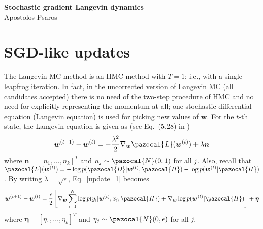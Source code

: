 

\newcommand{\bw}{\boldsymbol{w}}
\newcommand{\bp}{\boldsymbol{p}}
\newcommand{\bth}{\boldsymbol{\theta}}
\newcommand{\bA}{\boldsymbol{A}}
\newcommand{\cH}{\pazocal{H}}
\newcommand{\cN}{\pazocal{N}}
\newcommand{\cP}{\pazocal{P}}
\newcommand{\cD}{\pazocal{D}}
\newcommand{\cO}{\pazocal{O}}
\newcommand{\cL}{\pazocal{L}}


\setcounter{tocdepth}{3}

	
	\sloppy
	
	\begin{center}	
		\Large
		\textbf{Stochastic gradient Langevin dynamics}\\
		\large
		Apostolos Psaros\\	
	\end{center}
	\vskip 0.25in
	


\section{SGD-like updates}\label{sec:introduction}
The Langevin MC method is an HMC method with $T=1$; i.e., with a single leapfrog iteration. 
In fact, in the uncorrected version of Langevin MC (all candidates accepted) there is no need of the two-step procedure of HMC and no need for explicitly representing the momentum at all; one stochastic differential equation (Langevin equation) is used for picking new values of $\bw$. 
For the $t$-th state, the Langevin equation is given as (see Eq.~(5.28) in \cite{neal1993probabilistic})
\begin{equation}\label{update_1}
	\bw^{(t+1)} - \bw^{(t)} = -\frac{\lambda^2}{2} \nabla_{\bw} \cL(\bw^{(t)}) + \lambda \boldsymbol{n}
\end{equation}
where $\boldsymbol{n} = [n_1,\dots,n_k]^T$ and $n_j \sim \cN(0, 1)$ for all $j$. 
Also, recall that $\cL(\bw^{(t)}) = -\log p(\cD|\bw^{(t)},\cH) - \log p(\bw^{(t)}|\cH)$. 
By writing $\lambda = \sqrt{\epsilon}$, Eq.~\eqref{update_1} becomes
\begin{equation}\label{update_2}
\bw^{(t+1)} - \bw^{(t)}= \frac{\epsilon}{2} \left[\nabla_{\bw} \sum_{i=1}^{N}\log p(y_i|\bw^{(t)},x_i,\cH) + \nabla_{\bw}\log p(\bw^{(t)}|\cH)\right] + \boldsymbol{\eta}
\end{equation}
where $\boldsymbol{\eta} = [\eta_1,\dots,\eta_k]^T$ and $\eta_j \sim \cN(0, \epsilon)$ for all $j$. 

